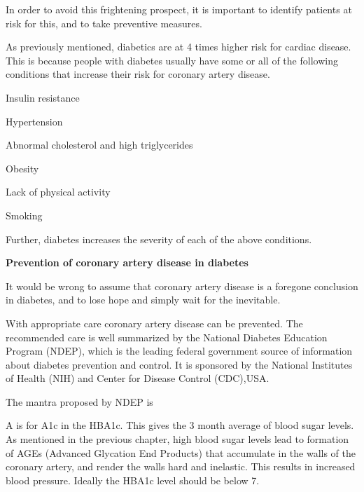 {In order to avoid this frightening prospect, it is important to identify patients at risk for this, and to take preventive measures.


As previously mentioned, diabetics are at 4 times higher risk for cardiac disease. This is because people with diabetes usually have some or all of the following conditions that increase their risk for coronary artery disease.

\item Insulin resistance

 \item Hypertension

 \item Abnormal cholesterol and high triglycerides

 \item Obesity

 \item Lack of physical activity

 \item Smoking

Further, diabetes increases the severity of each of the above conditions.

\textbf{Prevention of coronary artery disease in diabetes}

It would be wrong to assume that coronary artery disease is a foregone conclusion in diabetes, and to lose hope and simply wait for the inevitable.

With appropriate care coronary artery disease can be prevented. The recommended care is well summarized by the National Diabetes Education Program (NDEP), which is the leading federal government source of information about diabetes prevention and control. It is sponsored by the National Institutes of Health (NIH) and Center for Disease Control (CDC),USA.

The mantra proposed by NDEP is 

\item A is for A1c in the HBA1c. This gives the 3 month average of blood sugar levels. As mentioned in the previous chapter, high blood sugar levels lead to formation of AGEs (Advanced Glycation End Products) that accumulate in the walls of the coronary artery, and render the walls hard and inelastic. This results in increased blood pressure. Ideally the HBA1c level should be below 7.

}
